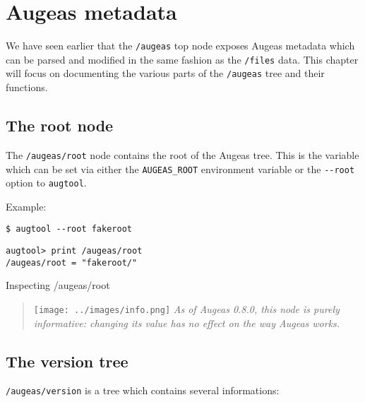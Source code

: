 \chapter{Augeas metadata}


We have seen earlier that the \nolinkurl{/augeas} top node exposes Augeas metadata which can be parsed and modified in the same fashion as the \nolinkurl{/files} data. This chapter will focus on documenting the various parts of the \nolinkurl{/augeas} tree and their functions.

\section{The root node}

  

The \nolinkurl{/augeas/root} node contains the root of the Augeas tree. This is the variable which can be set via either the \verb!AUGEAS_ROOT! environment variable or the \verb!--root! option to \verb!augtool!.


Example:

\begin{listing}
  \begin{verbatim}
$ augtool --root fakeroot
  \end{verbatim}
  \begin{verbatim}
augtool> print /augeas/root
/augeas/root = "fakeroot/"
  \end{verbatim}
  \caption{Inspecting /augeas/root}
  \label{lst:metadata_root}
\end{listing}

\begin{quote}
\texttt{[image: ../images/info.png]} \emph{As of Augeas 0.8.0, this node is purely informative: changing its value has no effect on the way Augeas works.}

\end{quote}
\section{The version tree}


\nolinkurl{/augeas/version} is a tree which contains several informations:


